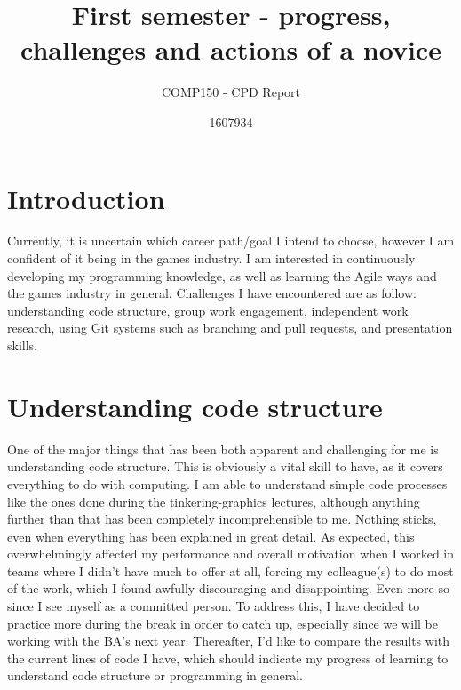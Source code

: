 \documentclass{scrartcl}
\title{First semester - progress, challenges and actions of a novice}
\subtitle{COMP150 - CPD Report}
\author{1607934}
\begin{document}
\maketitle

\section{Introduction}

Currently, it is uncertain which career path/goal I intend to choose, however I am confident of it being in the games industry. I am interested in continuously developing my programming knowledge, as well as learning the Agile ways and the games industry in general. Challenges I have encountered are as follow: understanding code structure, group work engagement, independent work research, using Git systems such as branching and pull requests, and presentation skills. 

\section{Understanding code structure}
One of the major things that has been both apparent and challenging for me is understanding code structure. This is obviously a vital skill to have, as it covers everything to do with computing. I am able to understand simple code processes like the ones done during the tinkering-graphics lectures, although anything further than that has been completely incomprehensible to me. Nothing sticks, even when everything has been explained in great detail. As expected, this overwhelmingly affected my performance and overall motivation when I worked in teams where I didn't have much to offer at all, forcing my colleague(s) to do most of the work, which I found awfully discouraging and disappointing. Even more so since I see myself as a committed person. To address this, I have decided to practice more during the break in order to catch up, especially since we will be working with the BA's next year. Thereafter, I'd like to compare the results with the current lines of code I have, which should indicate my progress of learning to understand code structure or programming in general.  
\end{document}
